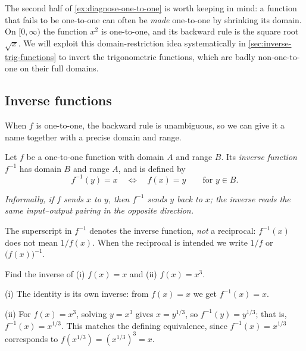 The second half of \cref{ex:diagnose-one-to-one} is worth keeping in mind: a function that fails to be one-to-one can often be \emph{made} one-to-one by shrinking its domain. On \([0, \infty)\) the function \(x^{2}\) is one-to-one, and its backward rule is the square root \(\sqrt{x}\). We will exploit this domain-restriction idea systematically in \cref{sec:inverse-trig-functions} to invert the trigonometric functions, which are badly non-one-to-one on their full domains.

\subsection{Inverse functions}

When \(f\) is one-to-one, the backward rule is unambiguous, so we can give it a name together with a precise domain and range.

\begin{definition}\label{def:inverse-function}
Let \(f\) be a one-to-one function with domain \(A\) and range \(B\). Its \emph{inverse function} \(f^{-1}\) has domain \(B\) and range \(A\), and is defined by
\[
f^{-1}(y) = x \quad\Longleftrightarrow\quad f(x) = y \qquad \text{for } y \in B.
\]

\emph{Informally, if \(f\) sends \(x\) to \(y\), then \(f^{-1}\) sends \(y\) back to \(x\); the inverse reads the same input--output pairing in the opposite direction.}
\end{definition}

\begin{caution}
The superscript in \(f^{-1}\) denotes the inverse function, \emph{not} a reciprocal: \(f^{-1}(x)\) does not mean \(1/f(x)\). When the reciprocal is intended we write \(1/f\) or \(\bigl(f(x)\bigr)^{-1}\).
\end{caution}

\begin{workedexample}
\begin{example}\label{ex:inverse-id-cube}
Find the inverse of (i) \(f(x) = x\) and (ii) \(f(x) = x^{3}\).
\end{example}

\begin{solution}
(i) The identity is its own inverse: from \(f(x) = x\) we get \(f^{-1}(x) = x\).

(ii) For \(f(x) = x^{3}\), solving \(y = x^{3}\) gives \(x = y^{1/3}\), so \(f^{-1}(y) = y^{1/3}\); that is, \(f^{-1}(x) = x^{1/3}\). This matches the defining equivalence, since \(f^{-1}(x) = x^{1/3}\) corresponds to \(f(x^{1/3}) = (x^{1/3})^{3} = x\).
\end{solution}
\end{workedexample}

